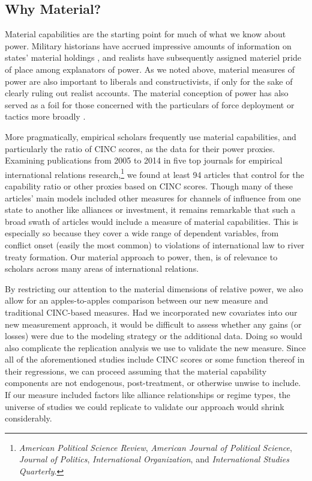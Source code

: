 \subsection{Why Material?}

Material capabilities are the starting point for much of what we know about power.
Military historians have accrued impressive amounts of information on states' material holdings \citep[e.g.,][Chapter~1]{taylor}, and realists have subsequently assigned materiel pride of place among explanators of power.
As we noted above, material measures of power are also important to liberals and constructivists, if only for the sake of clearly ruling out realist accounts.
The material conception of power has also served as a foil for those concerned with the particulars of force deployment or tactics more broadly \citep{biddle}.

More pragmatically, empirical scholars frequently use material capabilities, and particularly the ratio of CINC scores, as the data for their power proxies.
Examining publications from 2005 to 2014 in five top journals for empirical international relations research,\footnote{%
\label{fn:journals}
  \emph{American Political Science Review}, \emph{American Journal of Political Science}, \emph{Journal of Politics}, \emph{International Organization}, and \emph{International Studies Quarterly}.
}
we found at least 94 articles that control for the capability ratio or other proxies based on CINC scores.
Though many of these articles' main models included other measures for channels of influence from one state to another like alliances or investment, it remains remarkable that such a broad swath of articles would include a measure of material capabilities.
This is especially so because they cover a wide range of dependent variables, from conflict onset (easily the most common) to violations of international law to river treaty formation.
Our material approach to power, then, is of relevance to scholars across many areas of international relations.

By restricting our attention to the material dimensions of relative power, we also allow for an apples-to-apples comparison between our new measure and traditional CINC-based measures.
Had we incorporated new covariates into our new measurement approach, it would be difficult to assess whether any gains (or losses) were due to the modeling strategy or the additional data.
Doing so would also complicate the replication analysis we use to validate the new measure.
Since all of the aforementioned studies include CINC scores or some function thereof in their regressions, we can proceed assuming that the material capability components are not endogenous, post-treatment, or otherwise unwise to include.
If our measure included factors like alliance relationships or regime types, the universe of studies we could replicate to validate our approach would shrink considerably.

